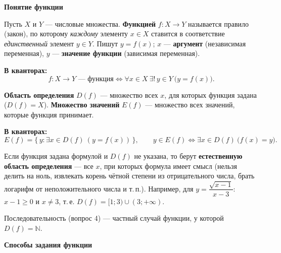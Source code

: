\documentclass[a4paper,11pt]{article}
\newcommand{\N}{\mathbb{N}}
\newcommand{\kv}{\par\noindent\textbf{\textcolor{oprc!85!black}{В кванторах:}}}
\newcommand{\podr}[1]{\par\needspace{8\baselineskip}\medskip
  {\large\bfseries\textcolor{oprc!80!black}{#1}}\par\nopagebreak\smallskip}
\begin{document}
\podr{Понятие функции}

\begin{opr}[функция]
Пусть $X$ и $Y$ --- числовые множества. \textbf{Функцией} $f\colon X \to Y$ называется правило (закон), по которому
\emph{каждому} элементу $x \in X$ ставится в соответствие \emph{единственный} элемент $y \in Y$. Пишут $y = f(x)$;
$x$ --- \textbf{аргумент} (независимая переменная), $y$ --- \textbf{значение функции} (зависимая переменная).
\kv
\[
  f\colon X \to Y \text{ --- функция} \Leftrightarrow \forall x \in X\ \exists!\, y \in Y\ \bigl(y = f(x)\bigr).
\]
\end{opr}

\begin{opr}
\textbf{Область определения} $D(f)$ --- множество всех $x$, для которых функция задана ($D(f) = X$).
\textbf{Множество значений} $E(f)$ --- множество всех значений, которые функция принимает.
\kv
\[
  E(f) = \{\, y : \exists x \in D(f)\ (y = f(x)) \,\}, \qquad
  y \in E(f) \Leftrightarrow \exists x \in D(f)\ \bigl(f(x) = y\bigr).
\]
\end{opr}

Если функция задана формулой и $D(f)$ не указана, то берут \textbf{естественную область определения} --- все $x$, при которых
формула имеет смысл (нельзя делить на ноль, извлекать корень чётной степени из отрицательного числа, брать логарифм от неположительного
числа и т.\,п.). Например, для $y = \dfrac{\sqrt{x - 1}}{x - 3}$: \ $x - 1 \ge 0$ и $x \ne 3$, т.\,е.
$D(f) = [1; 3) \cup (3; +\infty)$.

Последовательность (вопрос 4) --- частный случай функции, у которой $D(f) = \N$.

\podr{Способы задания функции}
\end{document}
